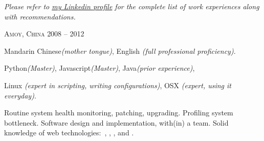 \documentclass[10pt,a4paper]{article} %
\begin{document}
\begin{center}
  \textit{Please refer to \href{http://www.linkedin.com/in/linju}{my Linkedin profile} for the complete list of work experiences along with recommendations.}
\end{center}


\spacedhrule{-0.2em}{-0.4em} %



 {
  \textsc{Amoy, China}
} {
   {
    2008 -- 2012
  } {
  }
}

\spacedhrule{0.5em}{-0.4em} %



 {
  Mandarin Chinese\textit{(mother tongue)},
  English \textit{(full professional proficiency)}.
}

 {
  Python\textit{(Master)},
  Javascript\textit{(Master)},
  Java\textit{(prior experience)},
}

 {
  Linux \textit{(expert in scripting, writing configurations)},
  OSX \textit{(expert, using it everyday)}.
}

 {
  Routine system health monitoring, patching, upgrading.
  Profiling system bottleneck.
  Software design and implementation, with(in) a team.
  Solid knowledge of web technologies:\ , , ,  and .
}
\end{document}
